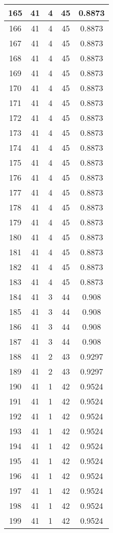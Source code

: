 \documentclass[letterpaper, 12pt]{article}
\begin{document}
\begin{longtable}{|c|c|c|c|c|}
\hline
165 & 41 & 4 & 45 & 0.8873 \\
\hline
166 & 41 & 4 & 45 & 0.8873 \\
\hline
167 & 41 & 4 & 45 & 0.8873 \\
\hline
168 & 41 & 4 & 45 & 0.8873 \\
\hline
169 & 41 & 4 & 45 & 0.8873 \\
\hline
170 & 41 & 4 & 45 & 0.8873 \\
\hline
171 & 41 & 4 & 45 & 0.8873 \\
\hline
172 & 41 & 4 & 45 & 0.8873 \\
\hline
173 & 41 & 4 & 45 & 0.8873 \\
\hline
174 & 41 & 4 & 45 & 0.8873 \\
\hline
175 & 41 & 4 & 45 & 0.8873 \\
\hline
176 & 41 & 4 & 45 & 0.8873 \\
\hline
177 & 41 & 4 & 45 & 0.8873 \\
\hline
178 & 41 & 4 & 45 & 0.8873 \\
\hline
179 & 41 & 4 & 45 & 0.8873 \\
\hline
180 & 41 & 4 & 45 & 0.8873 \\
\hline
181 & 41 & 4 & 45 & 0.8873 \\
\hline
182 & 41 & 4 & 45 & 0.8873 \\
\hline
183 & 41 & 4 & 45 & 0.8873 \\
\hline
184 & 41 & 3 & 44 & 0.908 \\
\hline
185 & 41 & 3 & 44 & 0.908 \\
\hline
186 & 41 & 3 & 44 & 0.908 \\
\hline
187 & 41 & 3 & 44 & 0.908 \\
\hline
188 & 41 & 2 & 43 & 0.9297 \\
\hline
189 & 41 & 2 & 43 & 0.9297 \\
\hline
190 & 41 & 1 & 42 & 0.9524 \\
\hline
191 & 41 & 1 & 42 & 0.9524 \\
\hline
192 & 41 & 1 & 42 & 0.9524 \\
\hline
193 & 41 & 1 & 42 & 0.9524 \\
\hline
194 & 41 & 1 & 42 & 0.9524 \\
\hline
195 & 41 & 1 & 42 & 0.9524 \\
\hline
196 & 41 & 1 & 42 & 0.9524 \\
\hline
197 & 41 & 1 & 42 & 0.9524 \\
\hline
198 & 41 & 1 & 42 & 0.9524 \\
\hline
199 & 41 & 1 & 42 & 0.9524 \\
\hline
\end{longtable}
\end{document}
